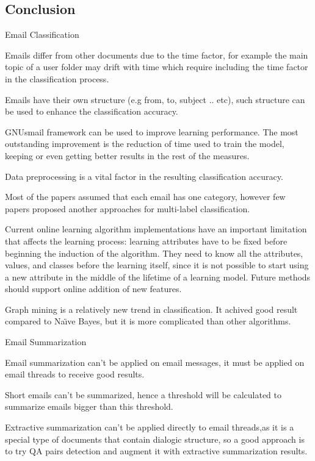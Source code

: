 \subsection{Conclusion}
\begin{my_itemize}
    \item Email Classification 
        \begin{my_itemize}
            \item Emails differ from other documents due to the time factor, for example  the main topic of a user folder may drift with time which require including the time factor in the classification process.
            \item Emails have their own structure (e.g from, to, subject .. etc), such structure can be used to enhance the classification accuracy.
            \item GNUsmail framework can be used to improve learning performance. The most outstanding improvement is the reduction of time used to train the model, keeping or even getting better results in the rest of the measures.
            \item Data preprocessing is a vital factor in the resulting classification accuracy.
            \item Most of the papers assumed that each email has one category, however few papers proposed another approaches for multi-label classification.
            \item Current online learning algorithm implementations have an important limitation that affects the learning process: learning attributes have to be fixed before beginning the induction of the algorithm. They need to know all the attributes, values, and classes before the learning itself, since it is not possible to start using a new attribute in the middle of the lifetime of a learning model. Future methods should support online addition of new features.
            \item Graph mining is a relatively new trend in classification. It achived good result compared to Na\"{\i}ve Bayes, but it is more complicated than other algorithms.
        \end{my_itemize}
    \item Email Summarization
        \begin{my_itemize}
            \item Email summarization can't be applied on email messages, it must be applied on email threads to receive good results.
            \item Short emails can't be summarized, hence a threshold will be calculated to summarize emails bigger than this threshold.
            \item Extractive summarization can't be applied directly to email threads,as it is a special type of documents that contain dialogic structure, so a good approach is to try QA pairs detection and augment it with extractive summarization results.
        \end{my_itemize}
\end{my_itemize}
